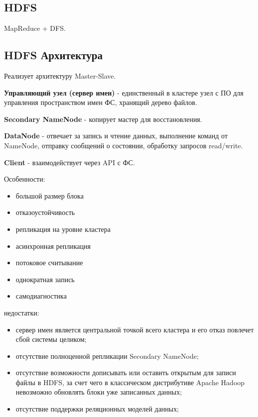 \subsection*{HDFS}


MapReduce + DFS.

\subsection*{HDFS Архитектура}

Реализует архитектуру Master-Slave.

\textbf{Управляющий узел (сервер имен)} - единственный в
кластере узел с ПО для управления пространством имен ФС,
хранящий дерево файлов.

\textbf{Secondary NameNode} - копирует мастер для восстановления.

\textbf{DataNode} - отвечает за запись и чтение данных,
выполнение команд от NameNode, отправку сообщений о состоянии,
обработку запросов read/write.

\textbf{Client} - взаимодействует через API с ФС.

Особенности:
\begin{itemize}
	\item большой размер блока
	\item отказоустойчивость
	\item репликация на уровне кластера
	\item асинхронная репликация
	\item потоковое считывание
	\item однократная запись
	\item самодиагностика
\end{itemize}

недостатки:
\begin{itemize}
	\item сервер имен является центральной точкой всего кластера и его
	отказ повлечет сбой системы целиком;
	\item отсутствие полноценной репликации Secondary NameNode;
	\item отсутствие возможности дописывать или оставить открытым
	для записи файлы в HDFS, за счет чего в классическом
	дистрибутиве Apache Hadoop невозможно обновлять блоки уже
	записанных данных;
	\item отсутствие поддержки реляционных моделей данных;
\end{itemize}